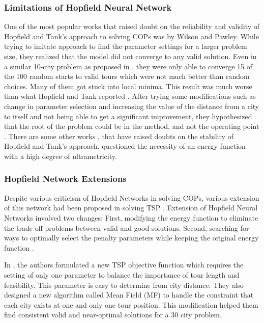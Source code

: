 \documentclass{article}
\begin{document}
\subsubsection{Limitations of Hopfield Neural Network}
One of the most popular works that raised doubt on the reliability and validity of Hopfield and Tank's approach to solving COPs was \cite{wilson1988stability} by Wilson and Pawley. While trying to imitate \cite{hopfield1985neural} approach to find the parameter settings for a larger problem size, they realized that the model did not converge to any valid solution. Even in a similar 10-city problem as proposed in \cite{hopfield1985neural}, they were only able to converge 15 of the 100 random starts to valid tours which were not much better than random choices. Many of them got stuck into local minima. This result was much worse than what Hopfield and Tank reported \cite{wilson1988stability}. After trying some modifications such as change in parameter selection and increasing the value of the distance from a city to itself and not being able to get a significant improvement, they hypothesized that the root of the problem could be in the method, and not the operating point \cite{smith1999neural}. There are some other works \cite{kamgar1992dynamical}, that have raised doubts on the stability of Hopfield and Tank's approach. \cite{lister1993annealing} questioned the necessity of an energy function with a high degree of ultrametricity.

\subsubsection{Hopfield Network Extensions}
Despite various criticism of Hopfield Networks in solving COPs, various extension of this network had been proposed in solving TSP \cite{den1988traveling, gee1995limitations, yao1988alternative, lin1994impact}. Extension of Hopfield Neural Networks involved two changes: First, modifying the energy function to eliminate the trade-off problems between valid and good solutions. Second, searching for ways to optimally select the penalty parameters while keeping the original energy function \cite{smith1999neural}. 

In \cite{den1988traveling}, the authors formulated a new TSP objective function which requires the setting of only one parameter to balance the importance of tour length and feasibility. This parameter is easy to determine from city distance. They also designed a new algorithm called Mean Field (MF) to handle the constraint that each city exists at one and only one tour position. This modification helped them find consistent valid and near-optimal solutions for a 30 city problem.
\end{document}
